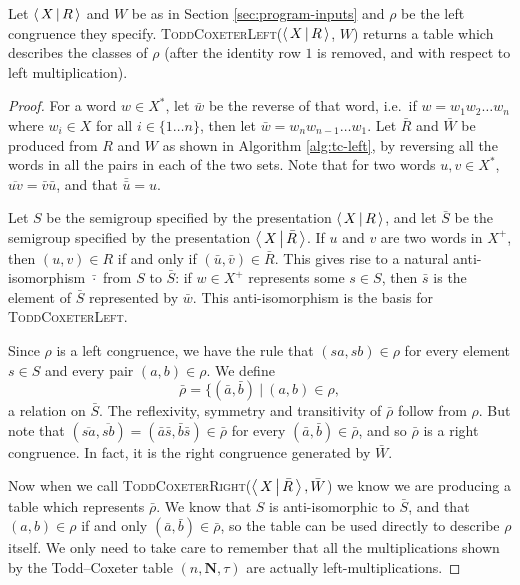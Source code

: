 \begin{theorem}
  Let $\left\langle \, X \, \middle| \, R \, \right\rangle$ and $W$ be as in Section \ref{sec:program-inputs} and $\rho$
  be the left congruence they specify.
  \textsc{ToddCoxeterLeft($\left\langle \, X \, \middle| \, R \, \right\rangle$, $W$)} returns a table which describes the
  classes of $\rho$ (after the identity row $1$ is removed, and with respect to
  left multiplication).
  \begin{proof}
    For a word $w \in X^*$, let $\bar w$ be the reverse of that word, i.e.~if
    $w = w_1 w_2 \ldots w_n$ where $w_i \in X$ for all $i \in \{1 \ldots n\}$,
    then let $\bar w = w_n w_{n-1} \ldots w_1$.  Let $\bar R$ and $\bar W$ be
    produced from $R$ and $W$ as shown in Algorithm \ref{alg:tc-left}, by
    reversing all the words in all the pairs in each of the two sets.
    Note that for two words $u, v \in X^*$, $\overline{uv} = \bar v \bar u$, and
    that $\bar{\bar u} = u$.

    Let $S$ be the semigroup specified by the presentation $\left\langle \, X \, \middle| \, R \, \right\rangle$, and let
    $\bar S$ be the semigroup specified by the presentation $\left\langle \, X \, \middle| \, \bar R \, \right\rangle$.
    If $u$ and $v$ are two words in $X^+$, then $(u, v) \in R$ if and only if
    $(\bar u, \bar v) \in \bar R$.  This gives rise to a natural anti-isomorphism
    $\bar \cdot$ from $S$ to $\bar S$: if $w \in X^+$ represents some $s \in S$,
    then $\bar s$ is the element of $\bar S$ represented by $\bar w$.  This
    anti-isomorphism is the basis for \textsc{ToddCoxeterLeft}.

    Since $\rho$ is a left congruence, we have the rule that $(sa, sb) \in \rho$
    for every element $s \in S$ and every pair $(a,b) \in \rho$.  We define
    $$\bar\rho = \{(\bar a, \bar b) ~|~ (a,b) \in \rho,$$
    a relation on $\bar S$.  The reflexivity, symmetry and transitivity of
    $\bar\rho$ follow from $\rho$.  But note that
    $(\overline{sa}, \overline{sb}) = (\bar a \bar s, \bar b \bar s) \in
    \bar\rho$
    for every $(\bar a, \bar b) \in \bar\rho$, and so $\bar\rho$ is a right
    congruence.  In fact, it is the right congruence generated by $\bar W$.

    Now when we call \textsc{ToddCoxeterRight}($\left\langle \, X \, \middle| \, \bar R \, \right\rangle, \bar W$) we
    know we are producing a table which represents $\bar\rho$.  We know that $S$
    is anti-isomorphic to $\bar S$, and that $(a,b) \in \rho$ if and only
    $(\bar a, \bar b) \in \bar\rho$, so the table can be used directly to
    describe $\rho$ itself.  We only need to take care to remember that all the
    multiplications shown by the Todd--Coxeter table $(n, \mathbf{N}, \tau)$ are
    actually left-multiplications.
  \end{proof}
\end{theorem}

